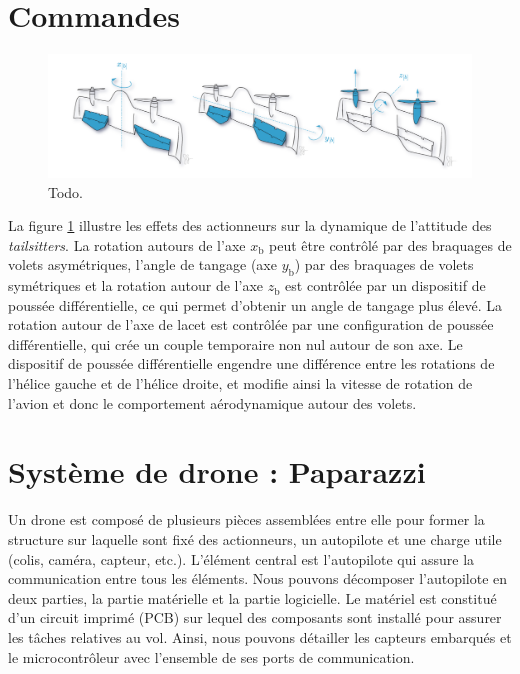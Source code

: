 \section{Commandes}

\begin{figure}[ht!]
    \centerline{
    \includegraphics[trim=0cm 0cm 0cm 0cm,clip,width=1\columnwidth]{figures/actionnement.png}}
    \caption{Todo.}
    \label{fig:actionDarko}
\end{figure}

La figure \ref{fig:actionDarko} illustre les effets des actionneurs sur la dynamique de l'attitude des \textit{tailsitters}. La rotation autours de l'axe $x_{\text{b}}$ peut être contrôlé par des braquages de volets asymétriques, l'angle de tangage (axe $y_{\text{b}}$) par des braquages de volets symétriques et la rotation autour de l'axe $z_{\text{b}}$ est contrôlée par un dispositif de poussée différentielle, ce qui permet d'obtenir un angle de tangage plus élevé. La rotation autour de l'axe de lacet est contrôlée par une configuration de poussée différentielle, qui crée un couple temporaire non nul autour de son axe. Le dispositif de poussée différentielle engendre une différence entre les rotations de l'hélice gauche et de l'hélice droite, et modifie ainsi la vitesse de rotation de l'avion et donc le comportement aérodynamique autour des volets.

\section{Système de drone : Paparazzi}

Un drone est composé de plusieurs pièces assemblées entre elle pour former la structure sur laquelle sont fixé des actionneurs, un autopilote et une charge utile (colis, caméra, capteur, etc.). L'élément central est l'autopilote qui assure la communication entre tous les éléments. Nous pouvons décomposer l'autopilote en deux parties, la partie matérielle et la partie logicielle. Le matériel est constitué d'un circuit imprimé (PCB) sur lequel des composants sont installé pour assurer les tâches relatives au vol. Ainsi, nous pouvons détailler les capteurs embarqués et le microcontrôleur avec l'ensemble de ses ports de communication.

